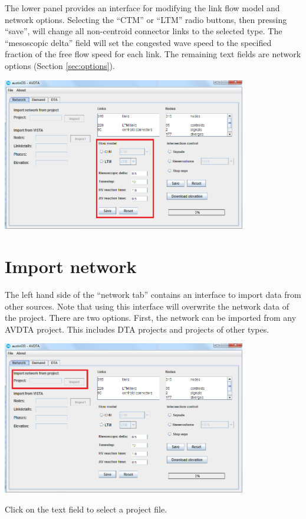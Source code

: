 The lower panel provides an interface for modifying the link flow model and network options. Selecting the ``CTM'' or ``LTM'' radio buttons, then pressing ``save'', will change all non-centroid connector links to the selected type. The ``mesoscopic delta'' field will set the congested wave speed to the specified fraction of the free flow speed for each link. The remaining text fields are network options (Section \ref{sec:options}).
\begin{center}
\includegraphics[width=0.8\textwidth]{images/links2.png}
\end{center}


\section{Import network}

The left hand side of the ``network tab'' contains an interface to import data from other sources. Note that using this interface will overwrite the network data of the project. There are two options. First, the network can be imported from any AVDTA project. This includes DTA projects and projects of other types. 
\begin{center}
\includegraphics[width=0.8\textwidth]{images/network1.png}
\end{center}
Click on the text field to select a project file.

